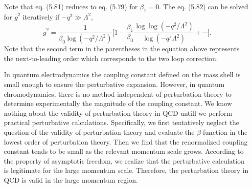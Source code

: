 Note that eq. (5.81) reduces to eq. (5.79) for $\beta_1=0$. The eq. (5.82) can be solved for $\bar{g}^2$ iteratively if $-q^2 \gg \Lambda^2$,
\begin{equation}
\bar{g}^2=\frac{1}{\beta_0\log(-q^2/\Lambda^2)}\biggl[ 1-\frac{\beta_1}{\beta_0}\frac{\log\log(-q^2/\Lambda^2)}{\log(-q^/\Lambda^2)}+\cdots \biggr].
\end{equation}
Note that the second term in the parentheses in the equation above represents the next-to-leading order which corresponds to the two loop correction.

In quantum electrodynamics the coupling constant defined on the mass shell is small enough to ensure the perturbative expansion. However, in quantum chromodynamics, there is no method independent of perturbation theory to determine experimentally the magnitude of the coupling constant. We know nothing about the validity of perturbation theory in QCD untill we perform practical perturbative calculations. Specifically, we first tentatively neglect the question of the validity of perturbation theory and evaluate the $\beta$-function in the lowest order of perturbation theory. Then we find that the renormalized coupling constant tends to be small as the relevant momentum scale grows. According to the property of asymptotic freedom, we realize that the perturbative calculation is legitimate for the large momentum scale. Therefore, the perturbation theory in QCD is valid in the large momentum region. 